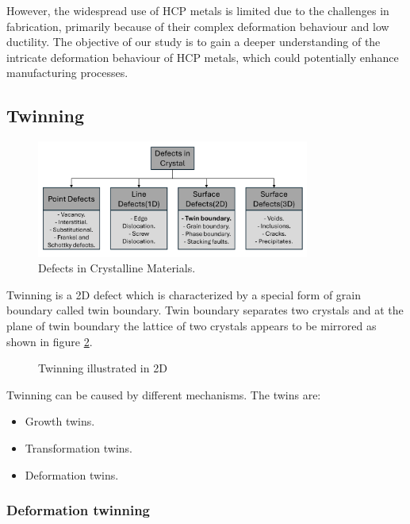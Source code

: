 \vspace{3mm}
However, the widespread use of HCP metals is limited due to the challenges in fabrication, primarily because of their complex deformation behaviour and low ductility. The objective of our study is to gain a deeper understanding of the intricate deformation behaviour of HCP metals, which could potentially enhance manufacturing processes.

\subsection{Twinning}

\begin{figure}[H]
  \centering
  \includegraphics[width=0.8\textwidth]{images/Defects_in_crystals.pdf}
  \caption{Defects in Crystalline Materials.}
  \label{CrystalDefects}
\end{figure}



Twinning is a 2D defect which is characterized by a special form of grain boundary called twin boundary. Twin boundary separates two crystals and at the plane of twin boundary the lattice of two crystals appears to be mirrored as shown in figure \ref{fig:Twinning in 2D}.

\begin{figure}[H]
    \centering
    \resizebox{0.4\textwidth}{!}{
    }
    \caption{Twinning illustrated in 2D}
    \label{fig:Twinning in 2D}
\end{figure}

Twinning can be caused by different mechanisms. The twins are:
\begin{itemize}
    \item Growth twins.
    \item Transformation twins.
    \item Deformation twins.
\end{itemize}

\subsubsection{Deformation twinning}

